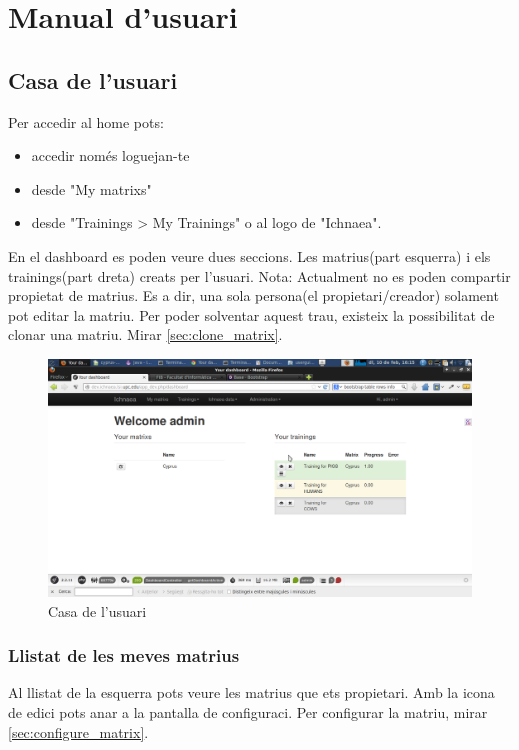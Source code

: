 \chapter*{Manual d'usuari}
\label{cha:userguide}

\section{Casa de l'usuari}
\label{sec:home}
Per accedir al home pots:
\begin{itemize}
\item accedir nom\'{e}s loguejan-te 
\item desde "My matrixs" 
\item desde "Trainings > My Trainings" o al logo de "Ichnaea".
\end{itemize}

En el dashboard es poden veure dues seccions. Les matrius(part esquerra) i els trainings(part dreta) creats per l'usuari. 
Nota: Actualment no es poden compartir propietat de matrius. Es a dir, una sola persona(el propietari/creador) solament pot editar la matriu. Per poder solventar aquest trau, existeix la possibilitat de clonar una matriu. Mirar \ref{sec:clone_matrix}.
\begin{figure}[h!]
  \centering
  \includegraphics[scale=0.2]{img/userguide/dashboard_complete_trainings.png}
  \caption{Casa de l'usuari}
  \label{fig:placement}
\end{figure}
 
\subsection{Llistat de les meves matrius}
Al llistat de la esquerra pots veure les matrius que ets propietari. Amb la icona de edici pots anar a la pantalla de configuraci. Per configurar la matriu, mirar \ref{sec:configure_matrix}.

